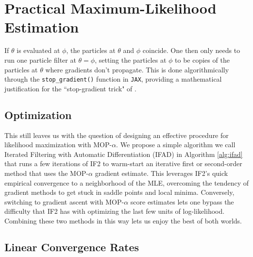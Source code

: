 \documentclass[9pt,twocolumn,twoside]{pnas-new}
\begin{document}
\section{Practical Maximum-Likelihood Estimation}


If $\theta$ is evaluated at $\phi$, the particles at $\theta$ and $\phi$ coincide. One then only needs to run one particle filter at $\theta=\phi$, setting the particles at $\phi$ to be copies of the particles at $\theta$ where gradients don't propagate. This is done algorithmically through the \texttt{stop\_gradient()} function in \texttt{JAX}, providing a mathematical justification for the ``stop-gradient trick" of \cite{scibior21}.

\subsection{Optimization}

This still leaves us with the question of designing an effective procedure for likelihood maximization with MOP-$\alpha$. We propose a simple algorithm we call Iterated Filtering with Automatic Differentiation (IFAD) in Algorithm \ref{alg:ifad} that runs a few iterations of IF2 to warm-start an iterative first or second-order method that uses the MOP-$\alpha$ gradient estimate. This leverages IF2's quick empirical convergence to a neighborhood of the MLE, overcoming the tendency of gradient methods to get stuck in saddle points and local minima. Conversely, switching to gradient ascent with MOP-$\alpha$ score estimates lets one bypass the difficulty that IF2 has with optimizing the last few units of log-likelihood. Combining these two methods in this way lets us enjoy the best of both worlds.

\subsection{Linear Convergence Rates}
\begin{thm}
    \label{thm:mop-convergence}
\end{thm}

\end{document}
